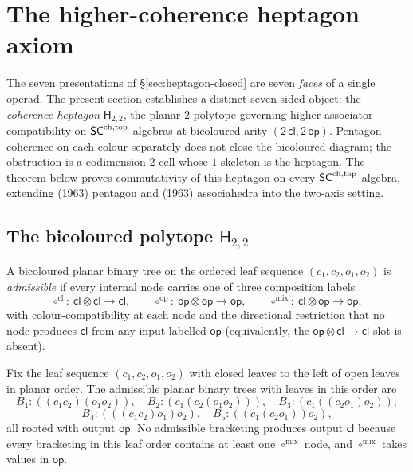 \section{The higher-coherence heptagon axiom}
\label{sec:heptagon-coherence-axiom}

The seven presentations of \S\ref{sec:heptagon-closed} are seven
\emph{faces} of a single operad. The present section establishes
a distinct seven-sided object: the \emph{coherence heptagon}
$\mathsf{H}_{2,2}$, the planar $2$-polytope governing higher-associator
compatibility on $\mathsf{SC}^{\mathrm{ch},\mathrm{top}}$-algebras at bicoloured arity
$(2\,\mathsf{cl},2\,\mathsf{op})$. Pentagon coherence on each colour
separately does not close the bicoloured diagram; the obstruction is
a codimension-$2$ cell whose $1$-skeleton is the heptagon. The
theorem below proves commutativity of this heptagon on every
$\mathsf{SC}^{\mathrm{ch},\mathrm{top}}$-algebra, extending  (1963) pentagon and
 (1963) associahedra into the two-axis setting.

\subsection{The bicoloured polytope $\mathsf{H}_{2,2}$}

\begin{definition}
\label{def:admissible-bracketing-22}%
%
A bicoloured planar binary tree on the ordered leaf sequence
$(c_1, c_2, o_1, o_2)$ is \emph{admissible} if every internal node
carries one of three composition labels
\[
\circ^{\mathrm{cl}}:\ \mathsf{cl}\otimes\mathsf{cl}\to\mathsf{cl},
\qquad
\circ^{\mathrm{op}}:\ \mathsf{op}\otimes\mathsf{op}\to\mathsf{op},
\qquad
\circ^{\mathrm{mix}}:\ \mathsf{cl}\otimes\mathsf{op}\to\mathsf{op},
\]
with colour-compatibility at each node and the directional restriction
that no node produces $\mathsf{cl}$ from any input labelled
$\mathsf{op}$ (equivalently, the $\mathsf{op}\otimes\mathsf{cl}\to
\mathsf{cl}$ slot is absent).
\end{definition}

\begin{lemma}\label{lem:five-order-preserving}%
%
Fix the leaf sequence $(c_1, c_2, o_1, o_2)$ with closed leaves to
the left of open leaves in planar order. The admissible planar
binary trees with leaves in this order are
\[
B_1:((c_1c_2)(o_1o_2)),\quad
B_2:(c_1(c_2(o_1o_2))),\quad
B_3:(c_1((c_2o_1)o_2)),
\]
\[
B_4:(((c_1c_2)o_1)o_2),\quad
B_5:((c_1(c_2o_1))o_2),
\]
all rooted with output $\mathsf{op}$. No admissible bracketing
produces output $\mathsf{cl}$ because every bracketing in this
leaf order contains at least one $\circ^{\mathrm{mix}}$ node, and
$\circ^{\mathrm{mix}}$ takes values in $\mathsf{op}$.
\end{lemma}

